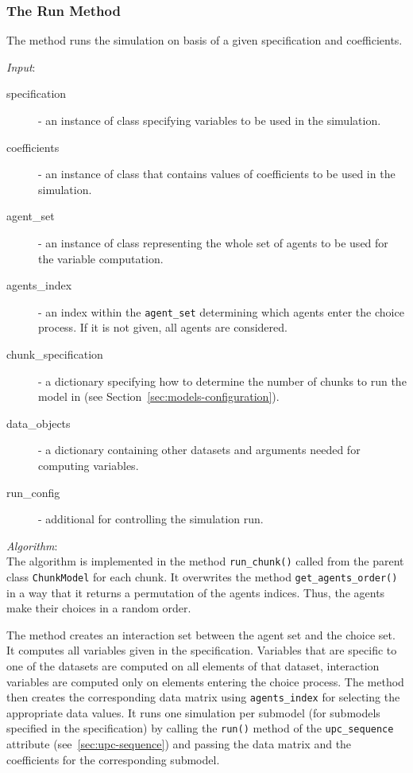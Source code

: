 {\subsubsection{The Run Method}
%
The  method runs the simulation on basis of a given specification
and coefficients. \coefficientsindex

{\it Input}:
\begin{description}
\item[specification] - an instance of class 
  specifying variables \variablesindex to be used in the simulation.
\item[coefficients] - an instance of class  \coefficientsindex that contains
  values of coefficients \coefficientsindex to be used in the simulation.
\item[agent_set] - an instance of class  \datasetindex representing the whole
  set of agents to be used for the variable \variablesindex computation.
\item[agents_index] - an index within the \verb|agent_set| determining which
  agents enter the choice process. If it is not given, all agents are
  considered.
\item[chunk_specification] - a dictionary specifying how to determine the number
  of chunks to run the model in (see Section~\ref{sec:models-configuration}).
\item[data_objects] - a dictionary containing other datasets \datasetindex and arguments
  needed for computing variables. \variablesindex
\item[run_config] - additional  for controlling the
  simulation run.
\end{description}


{\it Algorithm}:~\\[1mm]
The algorithm is implemented in the method \verb|run_chunk()| called from the
parent class \verb|ChunkModel| for each chunk. It overwrites the
 method \verb|get_agents_order()| in a way that it returns a
permutation of the agents indices. Thus, the agents make their choices in a
random order.

The method creates an interaction set between the agent set and the choice
set. It computes all variables \variablesindex given in the specification. Variables \variablesindex that are
specific to one of the datasets \datasetindex are computed on all elements of that dataset, \datasetindex
interaction variables \variablesindex are computed only on elements entering the choice
process. The method then creates the corresponding data matrix using
\verb|agents_index| for selecting the appropriate data values. It runs one
simulation per submodel (for submodels specified in the specification) by
calling the \verb|run()| method of the \verb|upc_sequence| attribute \attributesindex
(see~\ref{sec:upc-sequence}) and passing the data matrix and the coefficients \coefficientsindex
for the corresponding submodel.

}
